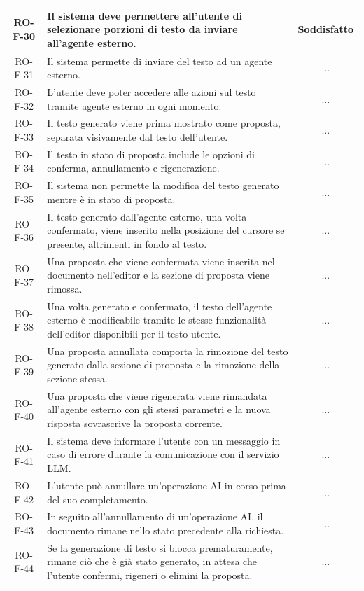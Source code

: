 \documentclass[11pt,a4paper]{article}
\begin{document}
\begin{longtable}{|c|p{11cm}|c|}
\hline
RO-F-30 & Il sistema deve permettere all'utente di selezionare porzioni di testo da inviare all'agente esterno. & Soddisfatto \\
\hline
RO-F-31 & Il sistema permette di inviare del testo ad un agente esterno. & ... \\
\hline
RO-F-32 & L'utente deve poter accedere alle azioni sul testo tramite agente esterno in ogni momento. & ... \\
\hline
RO-F-33 & Il testo generato viene prima mostrato come proposta, separata visivamente dal testo dell'utente. & ... \\
\hline
RO-F-34 & Il testo in stato di proposta include le opzioni di conferma, annullamento e rigenerazione. & ... \\
\hline
RO-F-35 & Il sistema non permette la modifica del testo generato mentre è in stato di proposta. & ... \\
\hline
RO-F-36 & Il testo generato dall'agente esterno, una volta confermato, viene inserito nella posizione del cursore se presente, altrimenti in fondo al testo. & ... \\
\hline
RO-F-37 & Una proposta che viene confermata viene inserita nel documento nell'editor e la sezione di proposta viene rimossa. & ... \\
\hline
RO-F-38 & Una volta generato e confermato, il testo dell'agente esterno è modificabile tramite le stesse funzionalità dell'editor disponibili per il testo utente. & ... \\
\hline
RO-F-39 & Una proposta annullata comporta la rimozione del testo generato dalla sezione di proposta e la rimozione della sezione stessa. & ... \\
\hline
RO-F-40 & Una proposta che viene rigenerata viene rimandata all'agente esterno con gli stessi parametri e la nuova risposta sovrascrive la proposta corrente. & ... \\
\hline
RO-F-41 & Il sistema deve informare l'utente con un messaggio in caso di errore durante la comunicazione con il servizio LLM. & ... \\
\hline
RO-F-42 & L'utente può annullare un'operazione AI in corso prima del suo completamento. & ... \\
\hline
RO-F-43 & In seguito all'annullamento di un'operazione AI, il documento rimane nello stato precedente alla richiesta. & ... \\
\hline
RO-F-44 & Se la generazione di testo si blocca prematuramente, rimane ciò che è già stato generato, in attesa che l'utente confermi, rigeneri o elimini la proposta. & ... \\

\end{longtable}
\end{document}
